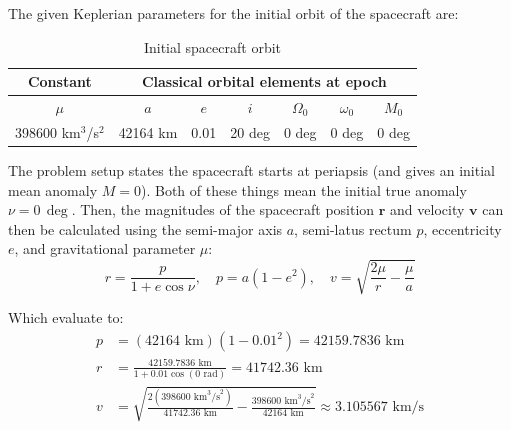 \documentclass[titlepage]{article}
\begin{document}
The given Keplerian parameters for the initial orbit of the spacecraft are:
\begin{table}[H]
	\centering
	\caption{Initial spacecraft orbit}
	\label{tab:initial_orbit}
	\begin{tabular}{|c|c|c|c|c|c|c|}
		\hline
		\multicolumn{1}{|c|}{Constant} & \multicolumn{6}{c|}{Classical orbital elements at epoch} \\
		\hline
		$\mu$ & $a$ & $e$ & $i$ & $\Omega_0$ & $\omega_0$ & $M_0$ \\
		\hline
		398600 km$^3$/s$^2$ & 42164 km & 0.01 & 20 deg & 0 deg & 0 deg & 0 deg \\
		\hline
	\end{tabular}
\end{table}

The problem setup states the spacecraft starts at periapsis (and gives an initial mean anomaly $M=0$). Both of these things mean the initial true anomaly $\nu=0\,\deg$. Then, the magnitudes of the spacecraft position $\boldsymbol{r}$ and velocity $\boldsymbol{v}$ can then be calculated using the semi-major axis $a$, semi-latus rectum $p$, eccentricity $e$, and gravitational parameter $\mu$:
\begin{equation}
	r=\frac{p}{1+e\cos{\nu}},\quad p=a(1-e^2),\quad v=\sqrt{\frac{2\mu}{r}-\frac{\mu}{a}}
\end{equation}

Which evaluate to:
\begin{equation}
	\begin{split}
		p&=(42164\text{ km})(1-0.01^2)=42159.7836\text{ km} \\
		r&=\frac{42159.7836\text{ km}}{1+0.01\cos(0\text{ rad})}=41742.36\text{ km} \\
		v&=\sqrt{\frac{2(398600\text{ km}^3\text{/s}^2)}{41742.36\text{ km}}-\frac{398600\text{ km}^3\text{/s}^2}{42164\text{ km}}}\approx3.105567\text{ km/s}
	\end{split}
\end{equation}
\end{document}
